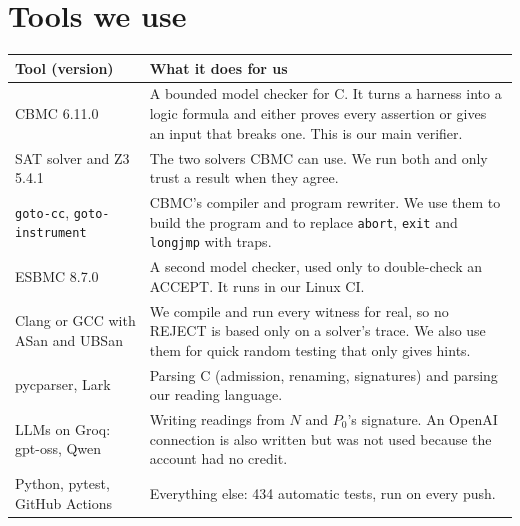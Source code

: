 \documentclass[10pt,a4paper]{article}
\newcommand{\Pz}{P_0}\newcommand{\Po}{P_1}
\begin{document}
\section{Tools we use}
\noindent\begin{tabularx}{\linewidth}{@{}l>{\raggedright\arraybackslash}X@{}}\toprule
Tool (version) & What it does for us\\\midrule
CBMC 6.11.0 & A bounded model checker for C. It turns a harness into a logic formula and either
proves every assertion or gives an input that breaks one. This is our main verifier.\\
SAT solver and Z3 5.4.1 & The two solvers CBMC can use. We run both and only trust a result when
they agree.\\
\texttt{goto-cc}, \texttt{goto-instrument} & CBMC's compiler and program rewriter. We use them to
build the program and to replace \texttt{abort}, \texttt{exit} and \texttt{longjmp} with traps.\\
ESBMC 8.7.0 & A second model checker, used only to double-check an ACCEPT. It runs in our Linux
CI.\\
Clang or GCC with ASan and UBSan & We compile and run every witness for real, so no REJECT is based
only on a solver's trace. We also use them for quick random testing that only gives hints.\\
pycparser, Lark & Parsing C (admission, renaming, signatures) and parsing our reading language.\\
LLMs on Groq: gpt-oss, Qwen & Writing readings from $N$ and $\Pz$'s signature. An OpenAI connection
is also written but was not used because the account had no credit.\\
Python, pytest, GitHub Actions & Everything else: 434 automatic tests, run on every push.\\\bottomrule
\end{tabularx}
\end{document}
